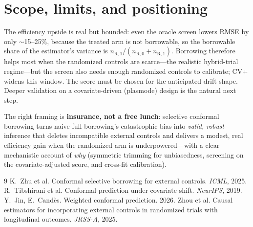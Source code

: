 \documentclass[11pt]{article}
\newcommand{\R}{\mathrm{R}}
\begin{document}
\section{Scope, limits, and positioning}
The efficiency upside is real but bounded: even the oracle screen lowers RMSE by only $\sim$15--25\%, because the treated arm is not borrowable, so the borrowable share of the estimator's variance is $n_{\R,1}/(n_{\R,0}+n_{\R,1})$. Borrowing therefore helps most when the randomized controls are scarce---the realistic hybrid-trial regime---but the screen also needs enough randomized controls to calibrate; CV+ widens this window. The score must be chosen for the anticipated drift shape. Deeper validation on a covariate-driven (plasmode) design is the natural next step.

The right framing is \textbf{insurance, not a free lunch}: selective conformal borrowing turns naive full borrowing's catastrophic bias into \emph{valid, robust} inference that deletes incompatible external controls and delivers a modest, real efficiency gain when the randomized arm is underpowered---with a clear mechanistic account of \emph{why} (symmetric trimming for unbiasedness, screening on the covariate-adjusted score, and cross-fit calibration).

\begin{thebibliography}{9}\small
{} K.~Zhu et al. Conformal selective borrowing for external controls. \emph{ICML}, 2025.
 R.~Tibshirani et al. Conformal prediction under covariate shift. \emph{NeurIPS}, 2019.
 Y.~Jin, E.~Cand\`es. Weighted conformal prediction. 2026.
 Zhou et al. Causal estimators for incorporating external controls in randomized trials with longitudinal outcomes. \emph{JRSS-A}, 2025.
\end{thebibliography}
\end{document}
